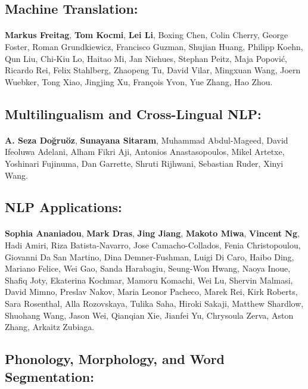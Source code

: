 \subsection*{Machine Translation:}
\paragraph{}\textbf{Markus Freitag}, \textbf{Tom Kocmi}, \textbf{Lei Li}, Boxing Chen, Colin Cherry, George Foster, Roman Grundkiewicz, Francisco Guzman, Shujian Huang, Philipp Koehn, Qun Liu, Chi-Kiu Lo, Haitao Mi, Jan Niehues, Stephan Peitz, Maja Popović, Ricardo Rei, Felix Stahlberg, Zhaopeng Tu, David Vilar, Mingxuan Wang, Joern Wuebker, Tong Xiao, Jingjing Xu, François Yvon, Yue Zhang, Hao Zhou.
\subsection*{Multilingualism and Cross-Lingual NLP:}
\paragraph{}\textbf{A. Seza Doğruöz}, \textbf{Sunayana Sitaram}, Muhammad Abdul-Mageed, David Ifeoluwa Adelani, Alham Fikri Aji, Antonios Anastasopoulos, Mikel Artetxe, Yoshinari Fujinuma, Dan Garrette, Shruti Rijhwani, Sebastian Ruder, Xinyi Wang.
\subsection*{NLP Applications:}
\paragraph{}\textbf{Sophia Ananiadou}, \textbf{Mark Dras}, \textbf{Jing Jiang}, \textbf{Makoto Miwa}, \textbf{Vincent Ng}, Hadi Amiri, Riza Batista-Navarro, Jose Camacho-Collados, Fenia Christopoulou, Giovanni Da San Martino, Dina Demner-Fushman, Luigi Di Caro, Haibo Ding, Mariano Felice, Wei Gao, Sanda Harabagiu, Seung-Won Hwang, Naoya Inoue, Shafiq Joty, Ekaterina Kochmar, Mamoru Komachi, Wei Lu, Shervin Malmasi, David Mimno, Preslav Nakov, Maria Leonor Pacheco, Marek Rei, Kirk Roberts, Sara Rosenthal, Alla Rozovskaya, Tulika Saha, Hiroki Sakaji, Matthew Shardlow, Shuohang Wang, Jason Wei, Qianqian Xie, Jianfei Yu, Chrysoula Zerva, Aston Zhang, Arkaitz Zubiaga.
\subsection*{Phonology, Morphology, and Word Segmentation:}
